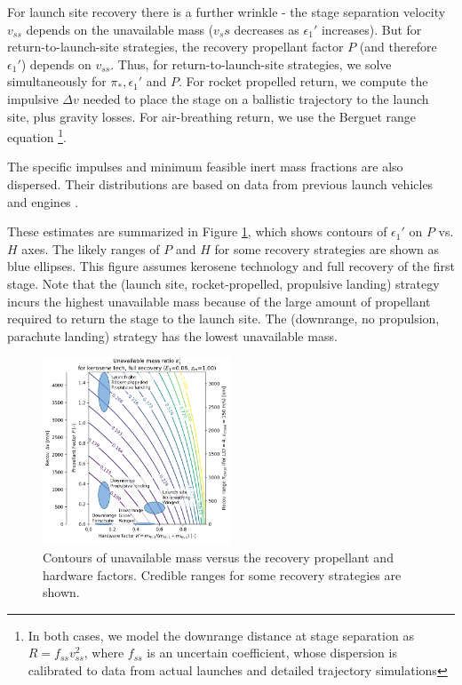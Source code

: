 \documentclass[conf]{new-aiaa}
\begin{document}
\begin{multicols}{2}
For launch site recovery there is a further wrinkle - the stage separation velocity $v_{ss}$ depends on the unavailable mass ($v_ss$ decreases as $\epsilon_1'$ increases). But for return-to-launch-site strategies, the recovery propellant factor $P$ (and therefore $\epsilon_1'$) depends on $v_{ss}$. Thus, for return-to-launch-site strategies, we solve simultaneously for $\pi_*, \epsilon_1'$ and $P$. For rocket propelled return, we compute the impulsive $\Delta v$ needed to place the stage on a ballistic trajectory to the launch site, plus gravity losses. For air-breathing return, we use the Berguet range equation \footnote{In both cases, we model the downrange distance at stage separation as $R = f_{ss} v_{ss}^2$, where $f_{ss}$ is an uncertain coefficient, whose dispersion is calibrated to data from actual launches and detailed trajectory simulations}.

The specific impulses and minimum feasible inert mass fractions are also dispersed. Their distributions are based on data from previous launch vehicles and engines \cite{Isakowitz2004, hist_lpre}. 

These estimates are summarized in Figure \ref{fig:unavail_mass_contours}, which shows contours of $\epsilon_1'$ on $P$ vs. $H$ axes. The likely ranges of $P$ and $H$ for some recovery strategies are shown as blue ellipses. This figure assumes kerosene technology and full recovery of the first stage. Note that the (launch site, rocket-propelled, propulsive landing) strategy incurs the highest unavailable mass because of the large amount of propellant required to return the stage to the launch site. The (downrange, no propulsion, parachute landing) strategy has the lowest unavailable mass. 

\begin{figure}[H]
    \centering
    \includegraphics[width=0.5\textwidth]{unavail_mass_contours_annotated}
    \caption{\label{fig:unavail_mass_contours} Contours of unavailable mass versus the recovery propellant and hardware factors. Credible ranges for some recovery strategies are shown.}
\end{figure}



\end{multicols}
\end{document}
